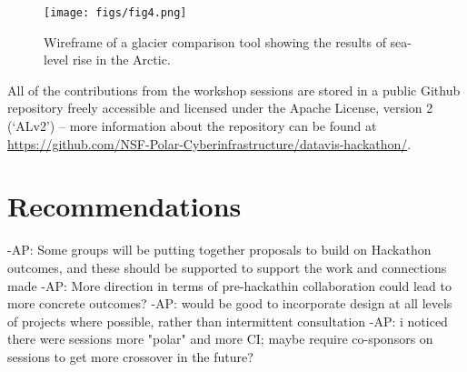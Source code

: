 \documentclass[11pt]{article}
\begin{document}
\begin{figure*}[htp]
    \centering
    \texttt{[image: figs/fig4.png]}
    \caption{Wireframe of a glacier comparison tool showing the results of sea-level rise in the Arctic.}
    \label{fig:website}
\end{figure*}

All of the contributions from the workshop sessions are stored in a public Github repository freely accessible and licensed under the Apache License, version 2 (`ALv2') -- more information about the repository can be found at \url{https://github.com/NSF-Polar-Cyberinfrastructure/datavis-hackathon/}. 

\section{Recommendations}
-AP: Some groups will be putting together proposals to build on Hackathon outcomes, and these should be supported to support the work and connections made
-AP: More direction in terms of pre-hackathin collaboration could lead to more concrete outcomes?
-AP: would be good to incorporate design at all levels of projects where possible, rather than intermittent consultation
-AP: i noticed there were sessions more "polar" and more CI; maybe require co-sponsors on sessions to get more crossover in the future?
\end{document}
